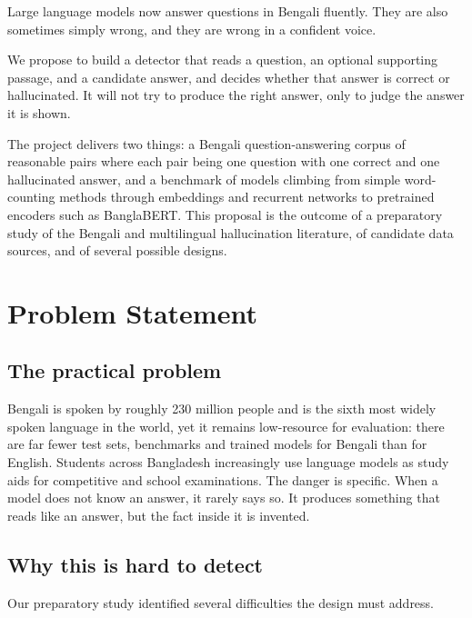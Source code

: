 \documentclass[12pt,a4paper]{article}
\begin{document}
Large language models now answer questions in Bengali fluently. They are also
sometimes simply wrong, and they are wrong in a confident voice.

We propose to build a detector that reads a question, an optional supporting
passage, and a candidate answer, and decides whether that answer is
correct or hallucinated. It will not try to produce the right
answer, only to judge the answer it is shown.

The project delivers two things: a Bengali question-answering corpus of reasonable pairs where each pair being one question with one correct and one
hallucinated answer, and a benchmark of models climbing from simple
word-counting methods through embeddings and recurrent networks to pretrained
encoders such as BanglaBERT. This proposal is the outcome of a preparatory study of the Bengali and
multilingual hallucination literature, of candidate data sources, and of several
possible designs.

\section{Problem Statement}

\subsection{The practical problem}

Bengali is spoken by roughly 230 million people and is the sixth most widely
spoken language in the world, yet it remains low-resource for evaluation: there
are far fewer test sets, benchmarks and trained models for Bengali than for
English. Students across Bangladesh increasingly use language models as study
aids for competitive and school examinations. The danger is specific. When a model does not know an answer, it rarely says so.
It produces something that reads like an answer, but the fact inside it is
invented.

\subsection{Why this is hard to detect}

Our preparatory study identified several difficulties the design must address.
\end{document}
